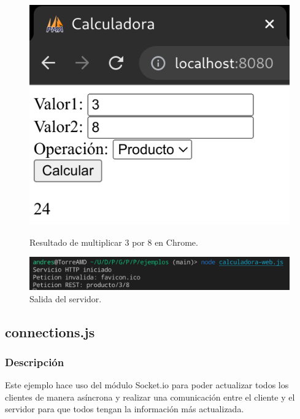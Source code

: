 \documentclass{article}
\begin{document}
\begin{figure}[H]
    \centering
    \begin{minipage}[H]{0.49\textwidth}
        \centering
        \includegraphics[width=\textwidth]{images/cwebprod.png}
        \caption{Resultado de multiplicar 3 por 8 en Chrome.}
    \end{minipage}
    \hfill
    \begin{minipage}[H]{0.49\textwidth}
        \centering
        \includegraphics[width=\textwidth]{images/cwebprodserver.png}
        \caption{Salida del servidor.}
    \end{minipage}
\end{figure}

\subsection{connections.js}
\subsubsection{Descripción}
Este ejemplo hace uso del módulo Socket.io para poder actualizar todos los clientes de manera asíncrona y realizar una comunicación entre el cliente y el servidor para que todos tengan la información más actualizada.
\end{document}
